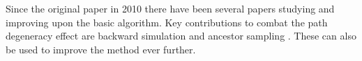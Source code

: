 Since the original \pmcmc paper in 2010 there have been several papers studying \citep{chopin2015,lindsten2015uniform} %
and improving upon the basic \pg algorithm. Key contributions to combat the path degeneracy effect are backward simulation \citep{whiteley2010efficient,lindsten2013backward}
and ancestor sampling \citep{lindstenJS2014}. These can also be used to improve the \ipmcmc method ever further.  





